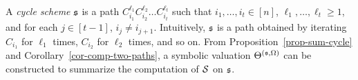 A \emph{cycle scheme} ${\mathfrak{s} }$ is a path $C_{i_1}^{\ell_1} C_{i_2}^{\ell_2} \dots C_{i_t}^{\ell_t}$ such that $i_1,\dots,i_t \in [n]$, $\ell_1,\dots, \ell_t \ge 1$, and for each $j\in [t-1]$, $i_j \neq i_{j+1}$. Intuitively, ${\mathfrak{s} }$ is a path obtained by iterating $C_{i_1}$ for $\ell_1$ times, $C_{i_2}$ for $\ell_2$ times, and so on. From Proposition~\ref{prop-sum-cycle} and Corollary~\ref{cor-comp-two-paths}, a symbolic valuation $\Theta^{({\mathfrak{s} },\Omega)}$ can be constructed 
to summarize the computation of ${\mathcal{S} }$ on ${\mathfrak{s} }$. %

